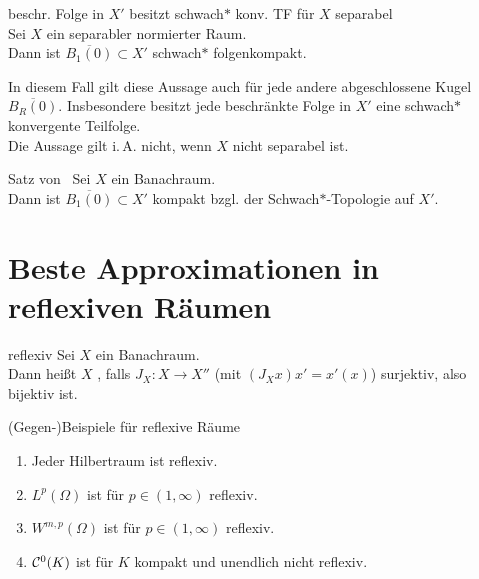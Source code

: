 \linie

\begin{Satz}{beschr. Folge in $X'$ besitzt schwach$\ast$ konv. TF für $X$ separabel}\\
    Sei $X$ ein separabler normierter Raum.\\
    Dann ist $\overline{B_1(0)} \subset X'$ schwach$\ast$ folgenkompakt.
\end{Satz}

\begin{Bem}
    In diesem Fall gilt diese Aussage auch für jede andere abgeschlossene Kugel
    $\overline{B_R(0)}$.
    Insbesondere besitzt jede beschränkte Folge in $X'$ eine schwach$\ast$ konvergente Teilfolge.\\
    Die Aussage gilt i.\,A. nicht, wenn $X$ nicht separabel ist.
\end{Bem}

\begin{Satz}{Satz von \scshape\,\!}
    Sei $X$ ein Banachraum.\\
    Dann ist $\overline{B_1(0)} \subset X'$ kompakt bzgl. der Schwach$\ast$-Topologie auf $X'$.
\end{Satz}

\pagebreak

\section{%
    Beste Approximationen in reflexiven Räumen%
}

\begin{Def}{reflexiv}
    Sei $X$ ein Banachraum.\\
    Dann heißt $X$ , falls $J_X\colon X \rightarrow X''$
    (mit $(J_X x)x' = x'(x)$) surjektiv, also bijektiv ist.
\end{Def}

\begin{Satz}{(Gegen-)Beispiele für reflexive Räume}
    \begin{enumerate}
        \item
        Jeder Hilbertraum ist reflexiv.

        \item
        $L^p(\Omega)$ ist für $p \in (1, \infty)$ reflexiv.

        \item
        $W^{m,p}(\Omega)$ ist für $p \in (1, \infty)$ reflexiv.

        \item
        $\mathcal{C}^0(K)$ ist für $K$ kompakt und unendlich nicht reflexiv.
    \end{enumerate}
\end{Satz}

